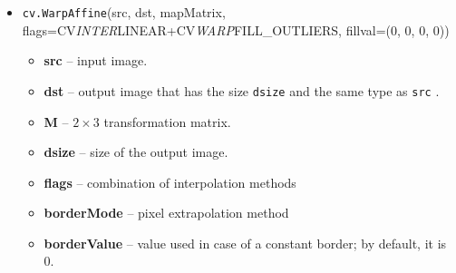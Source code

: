 \documentclass[11pt]{ctexart}
\begin{document}
    \begin{itemize}
    \item
      \texttt{cv.WarpAffine}(src, dst, mapMatrix,
      flags=CV\emph{INTER}LINEAR+CV\emph{WARP}FILL\_OUTLIERS, fillval=(0, 0,
      0, 0))
      \begin{itemize}
      \item
        \textbf{src} -- input image.
      \item
        \textbf{dst} -- output image that has the size \texttt{dsize} and
        the same type as \texttt{src} .
      \item
        \textbf{M} -- \(2 \times 3\) transformation matrix.
      \item
        \textbf{dsize} -- size of the output image.
      \item
        \textbf{flags} -- combination of interpolation methods
      \item
        \textbf{borderMode} -- pixel extrapolation method
      \item
        \textbf{borderValue} -- value used in case of a constant border; by
        default, it is 0.
        \end{itemize}
    \end{itemize}
\end{document}
